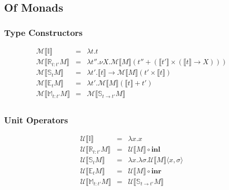 \documentclass{article}[11pt]
\begin{document}
\subsection{Of Monads}

\subsubsection{Type Constructors}
\begin{eqnarray*}
\mathcal{M}\llbracket{}\mathbb{I}\rrbracket &=& \lambda t . t\\
\mathcal{M}\llbracket{}\mathbb{R}_{t:t'}M\rrbracket &=& \lambda t'' . \nu{}X . \mathcal{M}\llbracket{}M\rrbracket (t'' + (\llbracket{}t'\rrbracket \times (\llbracket{}t\rrbracket \rightarrow X)))\\
\mathcal{M}\llbracket{}\mathbb{S}_t M\rrbracket &=& \lambda t' . \llbracket{}t\rrbracket \rightarrow \mathcal{M}\llbracket{}M\rrbracket (t' \times \llbracket{}t\rrbracket)\\
\mathcal{M}\llbracket{}\mathbb{E}_t M\rrbracket &=& \lambda{} t' . \mathcal{M}\llbracket{}M\rrbracket (\llbracket{}t\rrbracket + t')\\
\mathcal{M}\llbracket{}\mathbb{M}_{t:t'} M\rrbracket &=& \mathcal{M}\llbracket{}\mathbb{S}_{t\rightarrow{}t'} M\rrbracket\\
\end{eqnarray*}

\subsubsection{Unit Operators}
\begin{eqnarray*}
\mathcal{U}\llbracket{}\mathbb{I}\rrbracket &=& \lambda x . x\\
\mathcal{U}\llbracket{}\mathbb{R}_{t:t'}M\rrbracket &=& \mathcal{U}\llbracket{}M\rrbracket \circ \mathbf{inl}\\
\mathcal{U}\llbracket{}\mathbb{S}_t M\rrbracket &=& \lambda x . \lambda \sigma . \mathcal{U}\llbracket{}M\rrbracket \langle x,\sigma \rangle\\
\mathcal{U}\llbracket{}\mathbb{E}_t M\rrbracket &=& \mathcal{U}\llbracket{}M\rrbracket \circ \mathbf{inr}\\
\mathcal{U}\llbracket{}\mathbb{M}_{t:t'} M\rrbracket &=& \mathcal{U}\llbracket{}\mathbb{S}_{t\rightarrow{}t'} M\rrbracket\\
\end{eqnarray*}
\end{document}

